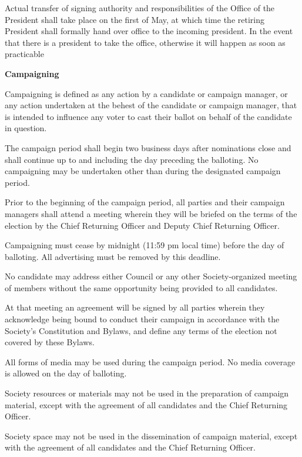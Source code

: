 \begin{longenum}[ label*=\thesection.\arabic*., align=left]
\begin{longenum}[label*=\arabic*., align=left]
  \item Actual transfer of signing authority and responsibilities of the Office of the President shall take place on the first of May, at which time the retiring President shall formally hand over office to the incoming president. In the event that there is a president to take the office, otherwise it will happen as soon as practicable
   \end{longenum}

 \item \textbf{Campaigning}
  \begin{longenum}[label*=\arabic*., align=left]
 \item Campaigning is defined as any action by a candidate or campaign manager, or any action undertaken at the behest of the candidate or campaign manager, that is intended to influence any voter to cast their ballot on behalf of the candidate in question.
\item The campaign period shall begin two business days after nominations close and shall continue up to and including the day preceding the balloting. No campaigning may be undertaken other than during the designated campaign period.
\item Prior to the beginning of the campaign period, all parties and their campaign managers shall attend a meeting wherein they will be briefed on the terms of the election by the Chief Returning Officer and Deputy Chief Returning Officer.
\item Campaigning must cease by midnight (11:59 pm local time) before the day of balloting. All advertising must be removed by this deadline. 
 \item No candidate may address either Council or any other Society-organized meeting of members without the same opportunity being provided to all candidates.
\item At that meeting an agreement will be signed by all parties wherein they acknowledge being bound to conduct their campaign in accordance with the Society's Constitution and Bylaws, and define any terms of the election not covered by these Bylaws.
\item All  forms of media may be used during  the campaign period. No media coverage is allowed on  the day of balloting.
\item  Society resources or materials may not be used in the preparation of campaign material, except with the agreement of all candidates and the Chief Returning Officer.
\item Society space may not be used in the dissemination of campaign material, except with the agreement of all candidates and the Chief Returning Officer.
 \end{longenum}


\end{longenum}
